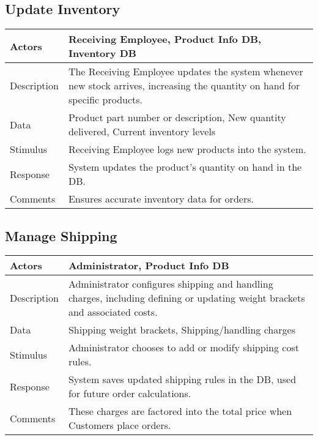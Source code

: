 \documentclass{report}
\begin{document}
    \pagebreak 
    \subsection{Update Inventory}
    \bigbreak \noindent 
    \begin{center}
    \begin{tabular}{|p{4cm}|p{8cm}|}
        \hline
        Actors & 
        Receiving Employee, Product Info DB, Inventory DB \\
        \hline
        Description & 
        The Receiving Employee updates the system whenever new stock 
        arrives, increasing the quantity on hand for specific products. \\
        \hline
        Data & 
        Product part number or description, New quantity delivered, Current inventory levels \\
        \hline
        Stimulus & 
        Receiving Employee logs new products into the system. \\
        \hline
        Response & 
        System updates the product’s quantity on hand in the DB. \\
        \hline
        Comments & 
        Ensures accurate inventory data for orders.  \\
        \hline
    \end{tabular}
\end{center}

    \pagebreak 
    \subsection{Manage Shipping}
    \bigbreak \noindent 
    \begin{center}
        \begin{tabular}{|p{4cm}|p{9cm}|}
            \hline
            Actors & 
            Administrator, Product Info DB \\
            \hline
            Description & 
            Administrator configures shipping and handling charges, including 
            defining or updating weight brackets and associated costs. \\
            \hline
            Data & Shipping weight brackets, Shipping/handling charges \\
            \hline
            Stimulus & 
            Administrator chooses to add or modify shipping cost rules. \\
            \hline
            Response & 
            System saves updated shipping rules in the DB, 
            used for future order calculations. \\
            \hline
            Comments & 
            These charges are factored into the total price when Customers 
            place orders. \\
            \hline
        \end{tabular}
    \end{center}
\end{document}
